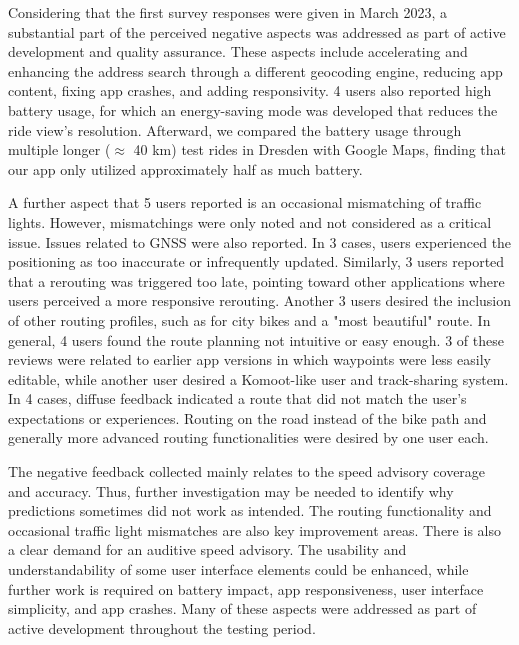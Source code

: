Considering that the first survey responses were given in March 2023, a substantial part of the perceived negative aspects was addressed as part of active development and quality assurance. These aspects include accelerating and enhancing the address search through a different geocoding engine, reducing app content, fixing app crashes, and adding responsivity. 4 users also reported high battery usage, for which an energy-saving mode was developed that reduces the ride view's resolution. Afterward, we compared the battery usage through multiple longer ($\approx$ 40 km) test rides in Dresden with Google Maps, finding that our app only utilized approximately half as much battery.

A further aspect that 5 users reported is an occasional mismatching of traffic lights. However, mismatchings were only noted and not considered as a critical issue. Issues related to GNSS were also reported. In 3 cases, users experienced the positioning as too inaccurate or infrequently updated. Similarly, 3 users reported that a rerouting was triggered too late, pointing toward other applications where users perceived a more responsive rerouting. Another 3 users desired the inclusion of other routing profiles, such as for city bikes and a "most beautiful" route. In general, 4 users found the route planning not intuitive or easy enough. 3 of these reviews were related to earlier app versions in which waypoints were less easily editable, while another user desired a Komoot-like user and track-sharing system. In 4 cases, diffuse feedback indicated a route that did not match the user's expectations or experiences. Routing on the road instead of the bike path and generally more advanced routing functionalities were desired by one user each.

The negative feedback collected mainly relates to the speed advisory coverage and accuracy. Thus, further investigation may be needed to identify why predictions sometimes did not work as intended. The routing functionality and occasional traffic light mismatches are also key improvement areas. There is also a clear demand for an auditive speed advisory. The usability and understandability of some user interface elements could be enhanced, while further work is required on battery impact, app responsiveness, user interface simplicity, and app crashes. Many of these aspects were addressed as part of active development throughout the testing period.

